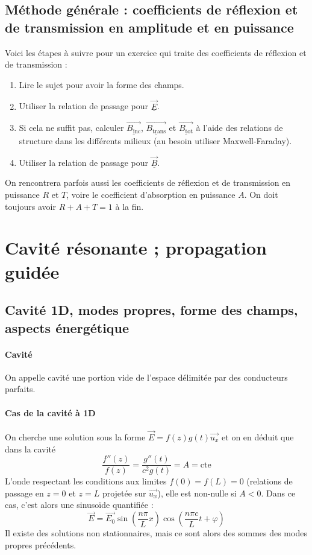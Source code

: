 \documentclass[french]{book}
\theoremstyle{plain}
\theoremstyle{definition}
\theoremstyle{remark}
\begin{document}
\subsection{Méthode générale : coefficients de réflexion et de transmission en amplitude et en puissance}
Voici les étapes à suivre pour un exercice qui traite des coefficients de réflexion et de transmission : 
\begin{enumerate}
	\item Lire le sujet pour avoir la forme des champs.
	\item Utiliser la relation de passage pour $\underline{\overrightarrow{E}}$.
	\item Si cela ne suffit pas, calculer $\underline{\overrightarrow{B_\text{inc}}}$, $\underline{\overrightarrow{B_\text{trans}}}$ et $\underline{\overrightarrow{B_\text{tot}}}$ à l'aide des relations de structure dans les différents milieux (au besoin utiliser Maxwell-Faraday).
	\item Utiliser la relation de passage pour $\underline{\overrightarrow{B}}$.
\end{enumerate}
On rencontrera parfois aussi les coefficients de réflexion et de transmission en puissance $R$ et $T$, voire le coefficient d'absorption en puissance $A$. On doit toujours avoir $R+A+T=1$ à la fin.
\section{Cavité résonante ; propagation guidée}
\subsection{Cavité 1D, modes propres, forme des champs, aspects énergétique}
\paragraph{Cavité} On appelle cavité une portion vide de l’espace délimitée par des conducteurs parfaits. 
\paragraph{Cas de la cavité à 1D}On cherche une solution sous la forme $\overrightarrow{E}=f(z)g(t)\overrightarrow{u_x}$ et on en déduit que dans la cavité $$\frac{f''(z)}{f(z)}=\frac{g''(t)}{c^2g(t)}=A= \text{cte}$$ L’onde respectant les conditions aux limites $f(0)=f(L)=0$ (relations de passage en $z=0$ et $z=L$ projetée sur $\overrightarrow{u_x}$), elle est non-nulle si $A<0$. Dans ce cas, c’est alors une sinusoïde quantifiée : $$\overrightarrow{E}=\overrightarrow{E_0}\sin\left(\frac{n\pi}{L}x\right)\cos\left(\frac{n\pi c}{L}t+\varphi\right)$$ Il existe des solutions non stationnaires, mais ce sont alors des sommes des modes propres précédents.
\end{document}
